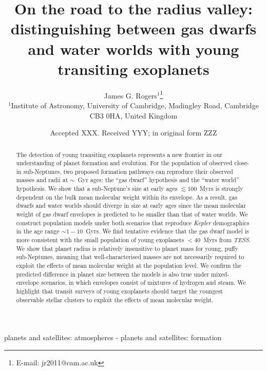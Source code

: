 \documentclass[fleqn,usenatbib]{mnras}
\title[On the road to the radius valley]{On the road to the radius valley: distinguishing between gas dwarfs and water worlds with young transiting exoplanets}
\author[J. G. Rogers]{
James G. Rogers$^{1}$\thanks{E-mail: jr2011@cam.ac.uk}
\\
$^{1}$Institute of Astronomy, University of Cambridge, Madingley Road, Cambridge CB3 0HA, United Kingdom
}
\date{Accepted XXX. Received YYY; in original form ZZZ}
\begin{document}
\label{firstpage}
\pagerange{\pageref{firstpage}--\pageref{lastpage}}
\maketitle

\begin{abstract}
The detection of young transiting exoplanets represents a new frontier in our understanding of planet formation and evolution. For the population of observed close-in sub-Neptunes, two proposed formation pathways can reproduce their observed masses and radii at $\sim$~Gyr ages: the ``gas dwarf'' hypothesis and the ``water world'' hypothesis. We show that a sub-Neptune's size at early ages $\lesssim 100$~Myrs is strongly dependent on the bulk mean molecular weight within its envelope. As a result, gas dwarfs and water worlds should diverge in size at early ages since the mean molecular weight of gas dwarf envelopes is predicted to be smaller than that of water worlds. We construct population models under both scenarios that reproduce \textit{Kepler} demographics in the age range $\sim1-10$~Gyrs. We find tentative evidence that the gas dwarf model is more consistent with the small population of young exoplanets $< 40$~Myrs from \textit{TESS}. We show that planet radius is relatively insensitive to planet mass for young, puffy sub-Neptunes, meaning that well-characterised masses are not necessarily required to exploit the effects of mean molecular weight at the population level. We confirm the predicted difference in planet size between the models is also true under mixed-envelope scenarios, in which envelopes consist of mixtures of hydrogen and steam. We highlight that transit surveys of young exoplanets should target the youngest observable stellar clusters to exploit the effects of mean molecular weight.
\end{abstract}

\begin{keywords}
planets and satellites: atmospheres -
planets and satellites: formation
\end{keywords}


\end{document}
